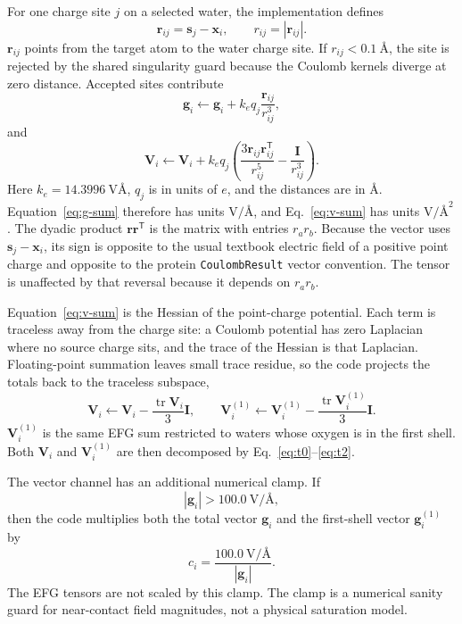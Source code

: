 \documentclass[11pt]{article}
\begin{document}
For one charge site \(j\) on a selected water, the implementation defines
\begin{equation}
  \bm r_{ij}=\bm s_j-\bm x_i,\qquad
  r_{ij}=|\bm r_{ij}|.
  \label{eq:r-def}
\end{equation}
\(\bm r_{ij}\) points from the target atom to the water charge site. If
\(r_{ij}<\SI{0.1}{\angstrom}\), the site is rejected by the shared
singularity guard because the Coulomb kernels diverge at zero distance.
Accepted sites contribute
\begin{equation}
  \bm g_i \leftarrow \bm g_i
  + k_e q_j\frac{\bm r_{ij}}{r_{ij}^3},
  \label{eq:g-sum}
\end{equation}
and
\begin{equation}
  \bm V_i \leftarrow \bm V_i
  + k_e q_j
    \left(
      \frac{3\bm r_{ij}\bm r_{ij}^{\mathsf T}}{r_{ij}^5}
      -\frac{\bm I}{r_{ij}^3}
    \right).
  \label{eq:v-sum}
\end{equation}
Here \(k_e=\SI{14.3996}{\volt\angstrom}\), \(q_j\) is in units of \(e\), and
the distances are in \(\si{\angstrom}\). Equation~\eqref{eq:g-sum} therefore
has units \(\si{\volt\per\angstrom}\), and Eq.~\eqref{eq:v-sum} has units
\(\si{\volt\per\square\angstrom}\). The dyadic product
\(\bm r\bm r^{\mathsf T}\) is the matrix with entries \(r_a r_b\).
Because the vector uses \(\bm s_j-\bm x_i\), its sign is opposite to the
usual textbook electric field of a positive point charge and opposite to the
protein \texttt{CoulombResult} vector convention. The tensor is unaffected by
that reversal because it depends on \(r_a r_b\).

Equation~\eqref{eq:v-sum} is the Hessian of the point-charge potential. Each
term is traceless away from the charge site: a Coulomb potential has zero
Laplacian where no source charge sits, and the trace of the Hessian is that
Laplacian. Floating-point summation leaves small trace residue, so the code
projects the totals back to the traceless subspace,
\begin{equation}
  \bm V_i \leftarrow
  \bm V_i-\frac{\operatorname{tr}\bm V_i}{3}\bm I,
  \qquad
  \bm V_i^{(1)} \leftarrow
  \bm V_i^{(1)}-\frac{\operatorname{tr}\bm V_i^{(1)}}{3}\bm I .
  \label{eq:detrace}
\end{equation}
\(\bm V_i^{(1)}\) is the same EFG sum restricted to waters whose oxygen is in
the first shell. Both \(\bm V_i\) and \(\bm V_i^{(1)}\) are then decomposed by
Eq.~\eqref{eq:t0}--\eqref{eq:t2}.

The vector channel has an additional numerical clamp. If
\begin{equation}
  |\bm g_i|>\SI{100.0}{\volt\per\angstrom},
  \label{eq:clamp-condition}
\end{equation}
then the code multiplies both the total vector \(\bm g_i\) and the first-shell
vector \(\bm g_i^{(1)}\) by
\begin{equation}
  c_i=\frac{\SI{100.0}{\volt\per\angstrom}}{|\bm g_i|}.
  \label{eq:clamp-scale}
\end{equation}
The EFG tensors are not scaled by this clamp. The clamp is a numerical sanity
guard for near-contact field magnitudes, not a physical saturation model.
\end{document}
